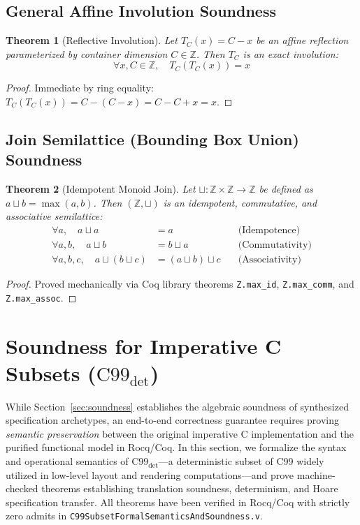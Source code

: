 \documentclass[10pt,journal,compsoc]{IEEEtran}
\newtheorem{theorem}{Theorem}
\begin{document}
\subsection{General Affine Involution Soundness}

\begin{theorem}[Reflective Involution]
Let $T_C(x) = C - x$ be an affine reflection parameterized by container dimension $C \in \mathbb{Z}$. Then $T_C$ is an exact involution:
\begin{equation}
\forall x, C \in \mathbb{Z}, \quad T_C(T_C(x)) = x
\end{equation}
\end{theorem}

\begin{proof}
Immediate by ring equality: $T_C(T_C(x)) = C - (C - x) = C - C + x = x$.
\end{proof}

\subsection{Join Semilattice (Bounding Box Union) Soundness}

\begin{theorem}[Idempotent Monoid Join]
Let $\sqcup : \mathbb{Z} \times \mathbb{Z} \to \mathbb{Z}$ be defined as $a \sqcup b = \max(a, b)$. Then $(\mathbb{Z}, \sqcup)$ is an idempotent, commutative, and associative semilattice:
\begin{align}
\forall a, \quad a \sqcup a &= a \quad &\text{(Idempotence)} \\
\forall a, b, \quad a \sqcup b &= b \sqcup a \quad &\text{(Commutativity)} \\
\forall a, b, c, \quad a \sqcup (b \sqcup c) &= (a \sqcup b) \sqcup c \quad &\text{(Associativity)}
\end{align}
\end{theorem}

\begin{proof}
Proved mechanically via Coq library theorems \texttt{Z.max\_id}, \texttt{Z.max\_comm}, and \texttt{Z.max\_assoc}.
\end{proof}

\section{Soundness for Imperative C Subsets ($\text{C99}_{\text{det}}$)}
\label{sec:c99_soundness}

While Section~\ref{sec:soundness} establishes the algebraic soundness of synthesized specification archetypes, an end-to-end correctness guarantee requires proving \emph{semantic preservation} between the original imperative C implementation and the purified functional model in Rocq/Coq. In this section, we formalize the syntax and operational semantics of $\text{C99}_{\text{det}}$---a deterministic subset of C99 widely utilized in low-level layout and rendering computations---and prove machine-checked theorems establishing translation soundness, determinism, and Hoare specification transfer. All theorems have been verified in Rocq/Coq with strictly zero admits in \texttt{C99SubsetFormalSemanticsAndSoundness.v}.
\end{document}
